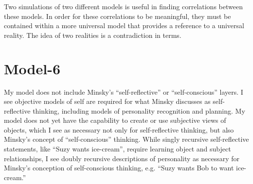 Two simulations of two different models is useful in finding
correlations between these models.  In order for these correlations to
be meaningful, they must be contained within a more universal model
that provides a reference to a universal reality.  The idea of two
realities is a contradiction in terms.


\section{Model-6}

My model does not include Minsky's ``self-reflective'' or
``self-conscious'' layers.  I see objective models of self are
required for what Minsky discusses as self-reflective thinking,
including models of personality recognition and planning.  My model
does not yet have the capability to create or use subjective views of
objects, which I see as necessary not only for self-reflective
thinking, but also Minsky's concept of ``self-conscious'' thinking.
While singly recursive self-reflective statements, like ``Suzy wants
ice-cream'', require learning object and subject relationships, I see
doubly recursive descriptions of personality as necessary for Minsky's
conception of self-conscious thinking, e.g. ``Suzy wants Bob to want
ice-cream.''

